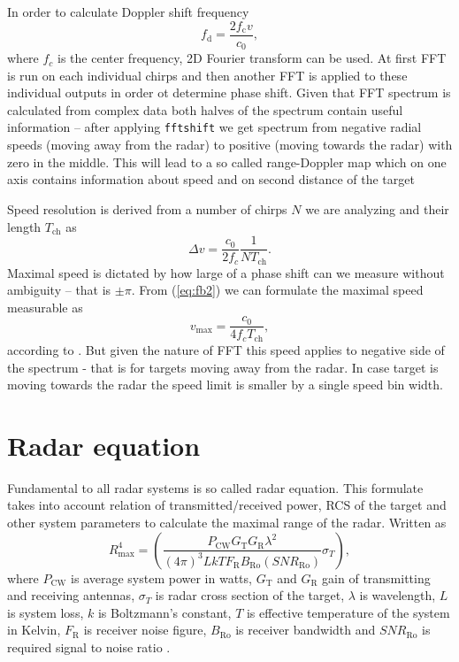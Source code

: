 In order to calculate Doppler shift frequency
\begin{equation}
  f_\mathrm{d} = \frac{2f_\mathrm{c}v}{c_0},
  \label{eq:Doppler2}
\end{equation}
where $f_c$ is the center frequency, 2D Fourier transform can be used.
At first FFT is run on each individual chirps and then another FFT is applied to these individual outputs in order ot determine phase shift.
Given that FFT spectrum is calculated from complex data both halves of the spectrum contain useful information -- after applying \verb|fftshift| we get spectrum from negative radial speeds (moving away from the radar) to positive (moving towards the radar) with zero in the middle.
This will lead to a so called range-Doppler map which on one axis contains information about speed and on second distance of the target \cite{suleymanov2016}

Speed resolution is derived from a number of chirps $N$ we are analyzing and their length $T_{\mathrm{ch}}$ as
\begin{equation}
  \Delta v = \frac{c_0}{2f_c} \frac{1}{NT_{\mathrm{ch}}}.
  \label{eq:Doppler3}
\end{equation}
Maximal speed is dictated by how large of a phase shift can we measure without ambiguity -- that is $\pm \pi$.
From (\ref{eq:fb2}) we can formulate the maximal speed measurable as
\[
  v_\mathrm{max} = \frac{c_0}{4f_c T_\mathrm{ch}},
\]
according to \cite{fmcwSpeed}.
But given the nature of FFT this speed applies to negative side of the spectrum - that is for targets moving away from the radar.
In case target is moving towards the radar the speed limit is smaller by a single speed bin width.

\section{Radar equation}

Fundamental to all radar systems is so called radar equation.
This formulate takes into account relation of transmitted/received power, RCS of the target and other system parameters to calculate the maximal range of the radar.
Written as
\begin{equation}
	R_\mathrm{max}^4 = \left(\frac{P_{\mathrm{CW}}G_\mathrm{T}G_\mathrm{R}\lambda^2}{(4\pi)^3 L k T F_\mathrm{R}B_\mathrm{Ro}(SNR_\mathrm{Ro})} \sigma_T\right),
	\label{eq:radar_eq}
\end{equation}
where $P_\mathrm{CW}$ is average system power in watts, $G_\mathrm{T}$ and $G_\mathrm{R}$ gain of transmitting and receiving antennas, $\sigma_T$ is radar cross section of the target, $\lambda$ is wavelength, $L$ is system loss, $k$ is Boltzmann's constant, $T$ is effective temperature of the system in Kelvin, $F_\mathrm{R}$ is receiver noise figure, $B_\mathrm{Ro}$ is receiver bandwidth and $SNR_\mathrm{Ro}$ is required signal to noise ratio \cite{jankiraman2018}.


